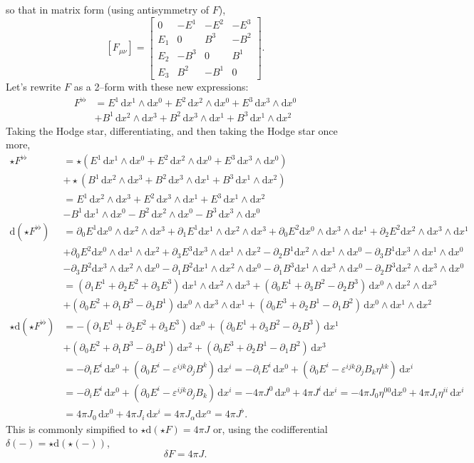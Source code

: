\documentclass[12pt]{memoir}
\def\dd{\mathrm d}
\def\pd{\partial}
\def\eps{\varepsilon}
\newcommand\dx[1]{\dd x^{#1}}
\newcommand\ddx[2]{\dd x^{#1}\wedge\dd x^{#2}}
\newcommand\dddx[3]{\dd x^{#1}\wedge\dd x^{#2}\wedge\dd x^{#3}}
\begin{document}
so that in matrix form (using antisymmetry of $F$),
\[[F_{\mu\nu}] = \left[
\begin{array}{cccc}
0 & -E^1 & -E^2 & -E^3\\
E_1 & 0 & B^3 & -B^2\\
E_2 & -B^3 & 0 & B^1\\
E_3 & B^2 & -B^1 & 0
\end{array}
\right].\]
Let's rewrite $F$ as a 2--form with these new expressions:
\begin{align*}
F^{\flat\flat}
&= E^1\,\ddx{1}{0}
+ E^2\,\ddx{2}{0}
+ E^3\,\ddx{3}{0}\\
&+ B^1\,\ddx{2}{3}
+ B^2\,\ddx{3}{1}
+ B^3\,\ddx{1}{2}
\end{align*}
Taking the Hodge star, differentiating, and then taking the Hodge star
once more,
\begin{align*}
\star F^{\flat\flat}
&= \star(E^1\,\ddx{1}{0}
+ E^2\,\ddx{2}{0}
+ E^3\,\ddx{3}{0})\\
&+ \star(B^1\,\ddx{2}{3}
+ B^2\,\ddx{3}{1}
+ B^3\,\ddx{1}{2})\\[0.5em]
&= E^1\,\ddx{2}{3}
+ E^2\,\ddx{3}{1}
+ E^3\,\ddx{1}{2}\\
&- B^1\,\ddx{1}{0}
- B^2\,\ddx{2}{0}
- B^3\,\ddx{3}{0}\\[1em]
\dd(\star F^{\flat\flat})
&=
\pd_0E^1\dddx{0}{2}{3} + \pd_1E^1\dddx{1}{2}{3}
+\pd_0E^2\dddx{0}{3}{1} + \pd_2E^2\dddx{2}{3}{1}\\
&+\pd_0E^2\dddx{0}{1}{2} + \pd_3E^3\dddx{3}{1}{2}
- \pd_2B^1\dddx{2}{1}{0} - \pd_3B^1\dddx{3}{1}{0}\\
&- \pd_3B^2\dddx{3}{2}{0} - \pd_1B^2\dddx{1}{2}{0}
- \pd_1B^3\dddx{1}{3}{0} - \pd_2B^3\dddx{2}{3}{0}\\[0.5em]
&= (\pd_1E^1 + \pd_2E^2 + \pd_3E^3)\,\dddx{1}{2}{3}
+ (\pd_0E^1 + \pd_3B^2 - \pd_2B^3)\,\dddx{0}{2}{3}\\
&+ (\pd_0E^2 + \pd_1B^3 - \pd_3B^1)\,\dddx{0}{3}{1}
+ (\pd_0E^3 + \pd_2B^1 - \pd_1B^2)\,\dddx{0}{1}{2}\\[1em]
\star\dd(\star F^{\flat\flat})
&= -(\pd_1E^1 + \pd_2E^2 + \pd_3E^3)\,\dx{0}
+ (\pd_0E^1 + \pd_3B^2 - \pd_2B^3)\,\dx{1}\\
&+ (\pd_0E^2 + \pd_1B^3 - \pd_3B^1)\,\dx{2}
+ (\pd_0E^3 + \pd_2B^1 - \pd_1B^2)\,\dx{3}\\
&= -\pd_iE^i\,\dx{0} + (\pd_0E^i - \eps^{ijk}\pd_jB^k)\,\dx{i}
= -\pd_iE^i\,\dx{0} + (\pd_0E^i - \eps^{ijk}\pd_jB_k\eta^{kk})\,\dx{i}\\
&= -\pd_iE^i\,\dx{0} + (\pd_0E^i - \eps^{ijk}\pd_jB_k)\,\dx{i}
= -4\pi J^0\,\dx{0} + 4\pi J^i\,\dx{i}
= -4\pi J_0\eta^{00}\dx{0} + 4\pi J_i\eta^{ii}\,\dx{i}\\
&= 4\pi J_0\,\dx{0} + 4\pi J_i\,\dx{i}
= 4\pi J_\alpha\dx{\alpha} = 4\pi J^\flat.
\end{align*}
This is commonly simpified to $\star\dd(\star F) = 4\pi J$ or,
using the codifferential $\delta(-) = \star\dd(\star(-))$,
\[\boxed{\delta F = 4\pi J.}\]
\end{document}
